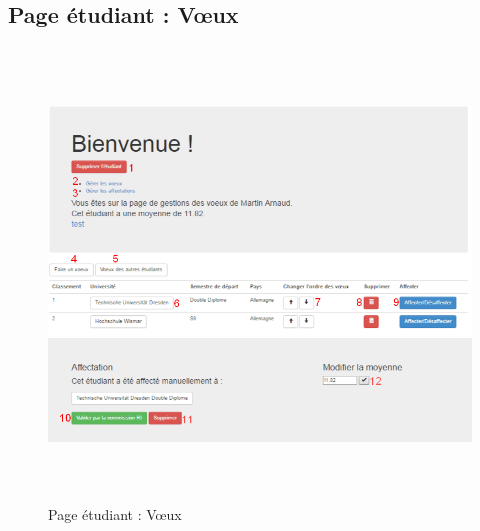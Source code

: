          \subsection{Page étudiant : Vœux}
         \label{ev}
         \begin{figure}[H]
         	\centering
         	\includegraphics[width=16cm,height=12cm]{Images/Admin/page_etud_admin.png}
         	\caption{Page étudiant : Vœux}
         	
         \end{figure}
